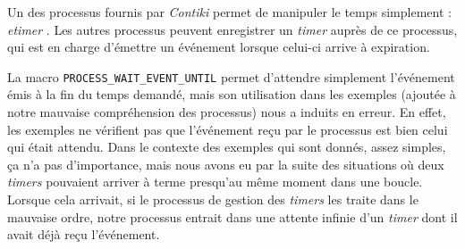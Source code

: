 Un des processus fournis par \emph{Contiki} permet de manipuler le temps simplement : \emph{etimer} .
Les autres processus peuvent enregistrer un \emph{timer} auprès de ce processus, qui est en charge d’émettre un événement lorsque celui-ci arrive à expiration.

La macro \texttt{PROCESS\_WAIT\_EVENT\_UNTIL} permet d’attendre simplement l’événement émis à la fin du temps demandé, mais son utilisation dans les exemples (ajoutée à notre mauvaise compréhension des processus) nous a induits en erreur.
En effet, les exemples ne vérifient pas que l’événement reçu par le processus est bien celui qui était attendu.
Dans le contexte des exemples qui sont donnés, assez simples, ça n’a pas d’importance, mais nous avons eu par la suite des situations où deux \emph{timers} pouvaient arriver à terme presqu’au même moment dans une boucle.
Lorsque cela arrivait, si le processus de gestion des \emph{timers} les traite dans le mauvaise ordre, notre processus entrait dans une attente infinie d’un \emph{timer} dont il avait déjà reçu l’événement.

